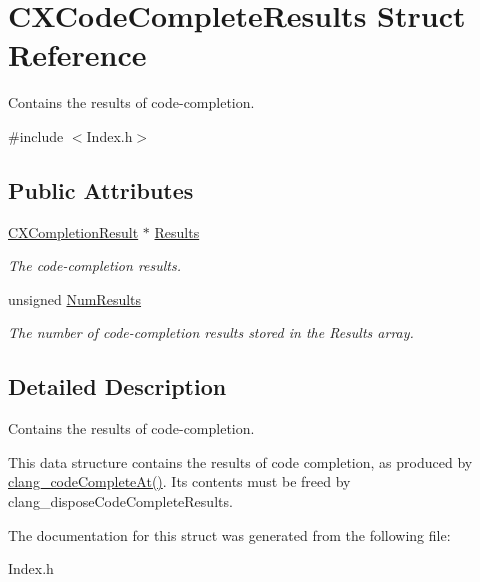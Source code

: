 \hypertarget{structCXCodeCompleteResults}{}\section{C\+X\+Code\+Complete\+Results Struct Reference}
\label{structCXCodeCompleteResults}


Contains the results of code-\/completion.  




{\ttfamily \#include $<$Index.\+h$>$}

\subsection*{Public Attributes}
\begin{DoxyCompactItemize}
\item 
\mbox{\label{structCXCodeCompleteResults_af907ee1afe92c439ec6b804650fcb0d2}} 
\mbox{\hyperlink{structCXCompletionResult}{C\+X\+Completion\+Result}} $\ast$ \mbox{\hyperlink{structCXCodeCompleteResults_af907ee1afe92c439ec6b804650fcb0d2}{Results}}
\begin{DoxyCompactList}\small\item\em The code-\/completion results. \end{DoxyCompactList}\item 
\mbox{\label{structCXCodeCompleteResults_ac9198de1f98a2df4783008d9dbe9cdcc}} 
unsigned \mbox{\hyperlink{structCXCodeCompleteResults_ac9198de1f98a2df4783008d9dbe9cdcc}{Num\+Results}}
\begin{DoxyCompactList}\small\item\em The number of code-\/completion results stored in the {\ttfamily Results} array. \end{DoxyCompactList}\end{DoxyCompactItemize}


\subsection{Detailed Description}
Contains the results of code-\/completion. 

This data structure contains the results of code completion, as produced by {\ttfamily \mbox{\hyperlink{group__CINDEX__CODE__COMPLET_ga50fedfa85d8d1517363952f2e10aa3bf}{clang\+\_\+code\+Complete\+At()}}}. Its contents must be freed by {\ttfamily clang\+\_\+dispose\+Code\+Complete\+Results}. 

The documentation for this struct was generated from the following file\+:\begin{DoxyCompactItemize}
\item 
Index.\+h\end{DoxyCompactItemize}
